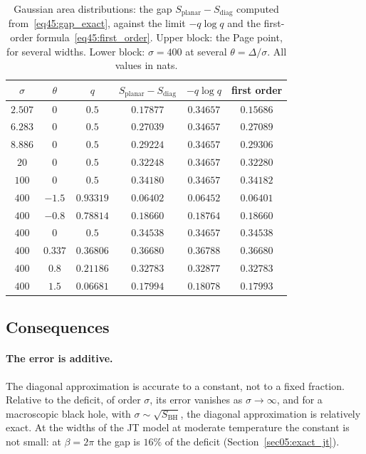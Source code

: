 \documentclass[11pt,letterpaper]{article}
\theoremstyle{plain}
\theoremstyle{definition}
\theoremstyle{remark}
\begin{document}
\begin{table}[htbp]
\centering
\caption{Gaussian area distributions: the gap $S_{\mathrm{planar}} - S_{\mathrm{diag}}$ computed from~\eqref{eq45:gap_exact}, against the limit $-q\log q$ and the first-order formula~\eqref{eq45:first_order}. Upper block: the Page point, for several widths. Lower block: $\sigma = 400$ at several $\theta = \Delta/\sigma$. All values in nats.}
\label{tab45:gaussian}
\begin{tabular}{cccccc}
\toprule
$\sigma$ & $\theta$ & $q$ & $S_{\mathrm{planar}} - S_{\mathrm{diag}}$ & $-q\log q$ & first order \\
\midrule
$2.507$ & $0$ & $0.5$ & $0.17877$ & $0.34657$ & $0.15686$ \\
$6.283$ & $0$ & $0.5$ & $0.27039$ & $0.34657$ & $0.27089$ \\
$8.886$ & $0$ & $0.5$ & $0.29224$ & $0.34657$ & $0.29306$ \\
$20$ & $0$ & $0.5$ & $0.32248$ & $0.34657$ & $0.32280$ \\
$100$ & $0$ & $0.5$ & $0.34180$ & $0.34657$ & $0.34182$ \\
\midrule
$400$ & $-1.5$ & $0.93319$ & $0.06402$ & $0.06452$ & $0.06401$ \\
$400$ & $-0.8$ & $0.78814$ & $0.18660$ & $0.18764$ & $0.18660$ \\
$400$ & $0$ & $0.5$ & $0.34538$ & $0.34657$ & $0.34538$ \\
$400$ & $0.337$ & $0.36806$ & $0.36680$ & $0.36788$ & $0.36680$ \\
$400$ & $0.8$ & $0.21186$ & $0.32783$ & $0.32877$ & $0.32783$ \\
$400$ & $1.5$ & $0.06681$ & $0.17994$ & $0.18078$ & $0.17993$ \\
\bottomrule
\end{tabular}
\end{table}

\subsection{Consequences}
\label{subsec45:consequences}

\paragraph{The error is additive.} The diagonal approximation is accurate to a constant, not to a fixed fraction. Relative to the deficit, of order $\sigma$, its error vanishes as $\sigma \to \infty$, and for a macroscopic black hole, with $\sigma \sim \sqrt{S_{\mathrm{BH}}}$, the diagonal approximation is relatively exact. At the widths of the JT model at moderate temperature the constant is not small: at $\beta = 2\pi$ the gap is $16\%$ of the deficit (Section~\ref{sec05:exact_jt}).
\end{document}
